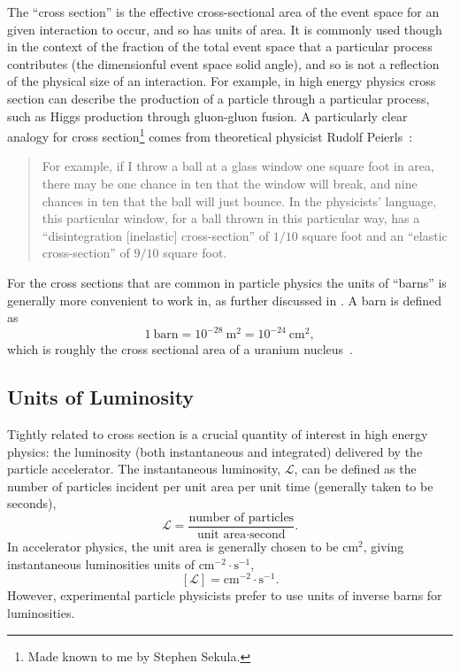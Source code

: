The ``cross section'' is the effective cross-sectional area of the event space for an given interaction to occur, and so has units of area.
It is commonly used though in the context of the fraction of the total event space that a particular process contributes (the dimensionful event space solid angle), and so is not a reflection of the physical size of an interaction.
For example, in high energy physics cross section can describe the production of a particle through a particular process, such as Higgs production through gluon-gluon fusion.
A particularly clear analogy for cross section\footnote{Made known to me by Stephen Sekula.} comes from theoretical physicist Rudolf Peierls~\cite{rhodes2012making}:
\begin{quote}
 For example, if I throw a ball at a glass window one square foot in area, there may be one chance in ten that the window will break, and nine chances in ten that the ball will just bounce.
 In the physicists' language, this particular window, for a ball thrown in this particular way, has a ``disintegration [inelastic] cross-section'' of $1/10$ square foot and an ``elastic cross-section'' of $9/10$ square foot.
\end{quote}
For the cross sections that are common in particle physics the units of ``barns'' is generally more convenient to work in, as further discussed in .
A barn is defined as
\begin{equation}
 1~\textrm{barn} = 10^{-28}~\textrm{m}^2 = 10^{-24}~\textrm{cm}^2,
 \label{eq:barn_to_area}
\end{equation}
which is roughly the cross sectional area of a uranium nucleus~\cite{web:history_physics_purdue,history:etymology_barn}.

\subsection{Units of Luminosity}\label{subsection:luminosity_units}
Tightly related to cross section is a crucial quantity of interest in high energy physics: the luminosity (both instantaneous and integrated) delivered by the particle accelerator.
The instantaneous luminosity, $\mathscr{L}$, can be defined as the number of particles incident per unit area per unit time (generally taken to be seconds),
\begin{equation}
 \mathscr{L} = \frac{\text{number of particles}}{\text{unit area} \cdot \text{second}}.
 \label{eq:instantaneous_luminosity}
\end{equation}
In accelerator physics, the unit area is generally chosen to be $\textrm{cm}^2$, giving instantaneous luminosities units of $\textrm{cm}^{-2} \cdot \textrm{s}^{-1}$,
\[
 \left[\mathscr{L}\right] = \textrm{cm}^{-2} \cdot \textrm{s}^{-1}.
\]
However, experimental particle physicists prefer to use units of inverse barns for luminosities.

